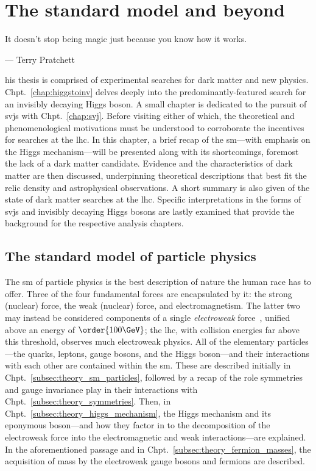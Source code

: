 \chapter{The standard model and beyond}
\label{chap:theory}

\epigraph{It doesn’t stop being magic just because you know how it works.}{--- Terry Pratchett}

his thesis is comprised of experimental searches for dark matter and new physics. Chpt.~\ref{chap:higgstoinv} delves deeply into the predominantly-featured search for an invisibly decaying Higgs boson. A small chapter is dedicated to the pursuit of \glspl{svj} with Chpt.~\ref{chap:svj}. Before visiting either of which, the theoretical and phenomenological motivations must be understood to corroborate the incentives for searches at the \acrlong{lhc}. In this chapter, a brief recap of the \acrlong{sm}---with emphasis on the Higgs mechanism---will be presented along with its shortcomings, foremost the lack of a dark matter candidate. Evidence and the characteristics of dark matter are then discussed, underpinning theoretical descriptions that best fit the relic density and astrophysical observations. A short summary is also given of the state of dark matter searches at the \acrshort{lhc}. Specific interpretations in the forms of \glspl{svj} and invisibly decaying Higgs bosons are lastly examined that provide the background for the respective analysis chapters.




\section{The standard model of particle physics}
\label{sec:theory_standardmodel}

The \acrlong{sm} of particle physics is the best description of nature the human race has to offer. Three of the four fundamental forces are encapsulated by it: the strong (nuclear) force, the weak (nuclear) force, and electromagnetism. The latter two may instead be considered components of a single \emph{electroweak} force~\cite{GLASHOW1961579,PhysRevLett.19.1264,Salam:1968rm}, unified above an energy of $\order{\text{100}\GeV}$; the \acrshort{lhc}, with collision energies far above this threshold, observes much electroweak physics. All of the elementary particles---the quarks, leptons, gauge bosons, and the Higgs boson---and their interactions with each other are contained within the \acrlong{sm}. These are described initially in Chpt.~\ref{subsec:theory_sm_particles}, followed by a recap of the role symmetries and gauge invariance play in their interactions with Chpt.~\ref{subsec:theory_symmetries}. Then, in Chpt.~\ref{subsec:theory_higgs_mechanism}, the Higgs mechanism and its eponymous boson---and how they factor in to the decomposition of the electroweak force into the electromagnetic and weak interactions---are explained. In the aforementioned passage and in Chpt.~\ref{subsec:theory_fermion_masses}, the acquisition of mass by the electroweak gauge bosons and fermions are  described.


